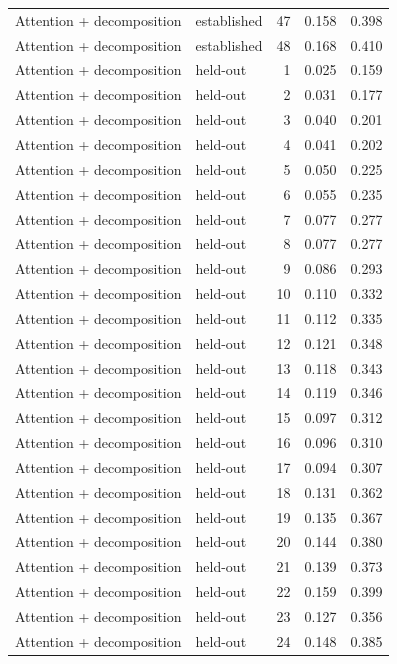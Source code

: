 \begin{tabular}{llrrr}
Attention + decomposition & established & 47 & 0.158 & 0.398 \\
Attention + decomposition & established & 48 & 0.168 & 0.410 \\
Attention + decomposition & held-out & 1 & 0.025 & 0.159 \\
Attention + decomposition & held-out & 2 & 0.031 & 0.177 \\
Attention + decomposition & held-out & 3 & 0.040 & 0.201 \\
Attention + decomposition & held-out & 4 & 0.041 & 0.202 \\
Attention + decomposition & held-out & 5 & 0.050 & 0.225 \\
Attention + decomposition & held-out & 6 & 0.055 & 0.235 \\
Attention + decomposition & held-out & 7 & 0.077 & 0.277 \\
Attention + decomposition & held-out & 8 & 0.077 & 0.277 \\
Attention + decomposition & held-out & 9 & 0.086 & 0.293 \\
Attention + decomposition & held-out & 10 & 0.110 & 0.332 \\
Attention + decomposition & held-out & 11 & 0.112 & 0.335 \\
Attention + decomposition & held-out & 12 & 0.121 & 0.348 \\
Attention + decomposition & held-out & 13 & 0.118 & 0.343 \\
Attention + decomposition & held-out & 14 & 0.119 & 0.346 \\
Attention + decomposition & held-out & 15 & 0.097 & 0.312 \\
Attention + decomposition & held-out & 16 & 0.096 & 0.310 \\
Attention + decomposition & held-out & 17 & 0.094 & 0.307 \\
Attention + decomposition & held-out & 18 & 0.131 & 0.362 \\
Attention + decomposition & held-out & 19 & 0.135 & 0.367 \\
Attention + decomposition & held-out & 20 & 0.144 & 0.380 \\
Attention + decomposition & held-out & 21 & 0.139 & 0.373 \\
Attention + decomposition & held-out & 22 & 0.159 & 0.399 \\
Attention + decomposition & held-out & 23 & 0.127 & 0.356 \\
Attention + decomposition & held-out & 24 & 0.148 & 0.385 \\

\end{tabular}
